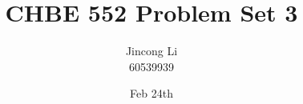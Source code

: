 \documentclass[a4paper,12pt]{article} %
\begin{document}
\setlength{\parskip}{1em} 
\setlength{\parindent}{0pt}
\newcommand{\vect}[1]{\mathbf{#1}}

\title{CHBE 552 Problem Set 3}
\author{Jincong Li \\ 60539939}
\date{Feb 24th}
\maketitle
\end{document}
